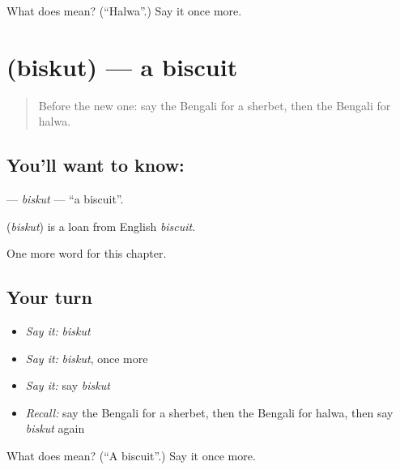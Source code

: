 \begin{tcolorbox}[breakable,colback=teal!4,colframe=teal!35!black,title={Before you move on}]
What does  mean? (\textquotedblleft{}Halwa\textquotedblright{}.) Say it once more.
\end{tcolorbox}
\section[\texorpdfstring{\bn{বিস্কুট} (biskut)}{বিস্কুট (biskut)}]{ (biskut) — a biscuit}

\label{lesson:BN-C119-biskut}



\begin{quote}
Before the new one: say the Bengali for a sherbet, then the Bengali for halwa.
\end{quote}

\subsection*{You'll want to know: }
\textbf{} — \emph{biskut} — \textquotedblleft{}a biscuit\textquotedblright{}.

\begin{cousinweb}
\textbf{} (\emph{biskut}) is a loan from English \emph{biscuit}.
\end{cousinweb}

\begin{grammarlens}[title={What you've built}]
One more word for this chapter.
\end{grammarlens}

\subsection*{Your turn}
\begin{itemize}
\raggedright
  \item \emph{Say it:} \emph{biskut}
  \item \emph{Say it:} \emph{biskut}, once more
  \item \emph{Say it:} say \emph{biskut}
  \item \emph{Recall:} say the Bengali for a sherbet, then the Bengali for halwa, then say \emph{biskut} again
\end{itemize}

\begin{tcolorbox}[breakable,colback=teal!4,colframe=teal!35!black,title={Before you move on}]
What does  mean? (\textquotedblleft{}A biscuit\textquotedblright{}.) Say it once more.
\end{tcolorbox}
